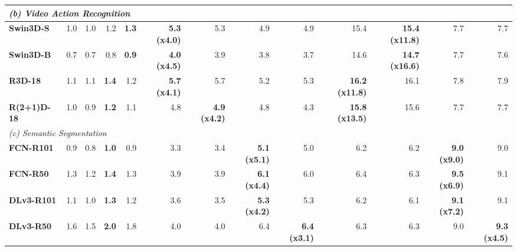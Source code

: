 \begin{table}[t]
{\begin{tabular}{lrrrrrrrrrrrr}
\midrule
\multicolumn{13}{l}{\textit{(b) Video Action Recognition}} \\
\midrule
\textbf{Swin3D-S} & 1.0 & 1.0 & 1.2 & \textcolor{blue!70!black}{\textbf{1.3}} & \textcolor{blue!70!black}{\textbf{5.3}} \textcolor{blue!70!black}{\textbf{(x4.0)}} & 5.3 & 4.9 & 4.9 & 15.4 & \textcolor{blue!70!black}{\textbf{15.4}} \textcolor{blue!70!black}{\textbf{(x11.8)}} & 7.7 & 7.7 \\
\textbf{Swin3D-B} & 0.7 & 0.7 & 0.8 & \textcolor{blue!70!black}{\textbf{0.9}} & \textcolor{blue!70!black}{\textbf{4.0}} \textcolor{blue!70!black}{\textbf{(x4.5)}} & 3.9 & 3.8 & 3.7 & 14.6 & \textcolor{blue!70!black}{\textbf{14.7}} \textcolor{blue!70!black}{\textbf{(x16.6)}} & 7.7 & 7.6 \\
\textbf{R3D-18} & 1.1 & 1.1 & \textcolor{blue!70!black}{\textbf{1.4}} & 1.2 & \textcolor{blue!70!black}{\textbf{5.7}} \textcolor{blue!70!black}{\textbf{(x4.1)}} & 5.7 & 5.2 & 5.3 & \textcolor{blue!70!black}{\textbf{16.2}} \textcolor{blue!70!black}{\textbf{(x11.8)}} & 16.1 & 7.8 & 7.9 \\
\textbf{R(2+1)D-18} & 1.0 & 0.9 & \textcolor{blue!70!black}{\textbf{1.2}} & 1.1 & 4.8 & \textcolor{blue!70!black}{\textbf{4.9}} \textcolor{blue!70!black}{\textbf{(x4.2)}} & 4.8 & 4.3 & \textcolor{blue!70!black}{\textbf{15.8}} \textcolor{blue!70!black}{\textbf{(x13.5)}} & 15.6 & 7.7 & 7.7 \\
\midrule
\multicolumn{13}{l}{\textit{(c) Semantic Segmentation}} \\
\midrule
\textbf{FCN-R101} & 0.9 & 0.8 & \textcolor{blue!70!black}{\textbf{1.0}} & 0.9 & 3.3 & 3.4 & \textcolor{blue!70!black}{\textbf{5.1}} \textcolor{blue!70!black}{\textbf{(x5.1)}} & 5.0 & 6.2 & 6.2 & \textcolor{blue!70!black}{\textbf{9.0}} \textcolor{blue!70!black}{\textbf{(x9.0)}} & 9.0 \\
\textbf{FCN-R50} & 1.3 & 1.2 & \textcolor{blue!70!black}{\textbf{1.4}} & 1.3 & 3.9 & 3.9 & \textcolor{blue!70!black}{\textbf{6.1}} \textcolor{blue!70!black}{\textbf{(x4.4)}} & 6.0 & 6.4 & 6.3 & \textcolor{blue!70!black}{\textbf{9.5}} \textcolor{blue!70!black}{\textbf{(x6.9)}} & 9.1 \\
\textbf{DLv3-R101} & 1.1 & 1.0 & \textcolor{blue!70!black}{\textbf{1.3}} & 1.2 & 3.6 & 3.5 & \textcolor{blue!70!black}{\textbf{5.3}} \textcolor{blue!70!black}{\textbf{(x4.2)}} & 5.3 & 6.2 & 6.1 & \textcolor{blue!70!black}{\textbf{9.1}} \textcolor{blue!70!black}{\textbf{(x7.2)}} & 9.1 \\
\textbf{DLv3-R50} & 1.6 & 1.5 & \textcolor{blue!70!black}{\textbf{2.0}} & 1.8 & 4.0 & 4.0 & 6.4 & \textcolor{blue!70!black}{\textbf{6.4}} \textcolor{blue!70!black}{\textbf{(x3.1)}} & 6.3 & 6.3 & 9.0 & \textcolor{blue!70!black}{\textbf{9.3}} \textcolor{blue!70!black}{\textbf{(x4.5)}} \\
\bottomrule
\end{tabular}%
}
\end{table}

